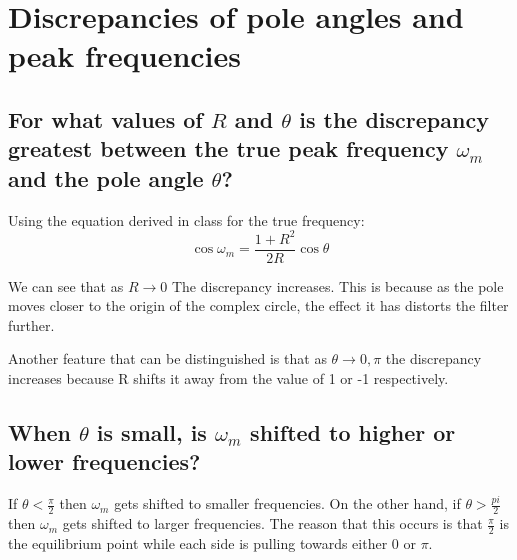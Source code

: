 \documentclass{article}
\begin{document}
\section{Discrepancies of pole angles and peak frequencies}

\subsection{For what values of $R$ and $\theta$ is the discrepancy greatest between the true peak frequency $\omega_m$ and the pole angle $\theta$?}
Using the equation derived in class for the true frequency:
$$
	\cos\omega_m = \frac{1+R^2}{2R}\cos\theta
$$

We can see that as $R \rightarrow 0$ The discrepancy increases.
This is because as the pole moves closer to the origin of the complex circle, the effect it has distorts the filter further.

Another feature that can be distinguished is that as $\theta \rightarrow 0, \pi$ the discrepancy increases because R shifts it away from the value of 1 or -1 respectively.

\subsection{When $\theta$ is small, is $\omega_m$ shifted to higher or lower frequencies?}
If $\theta < \frac{\pi}{2}$ then $\omega_m$ gets shifted to smaller frequencies.
On the other hand, if $\theta > \frac{pi}{2}$ then $\omega_m$ gets shifted to larger frequencies.
The reason that this occurs is that $\frac{\pi}{2}$ is the equilibrium point while each side is pulling towards either 0 or $\pi$.
\end{document}
